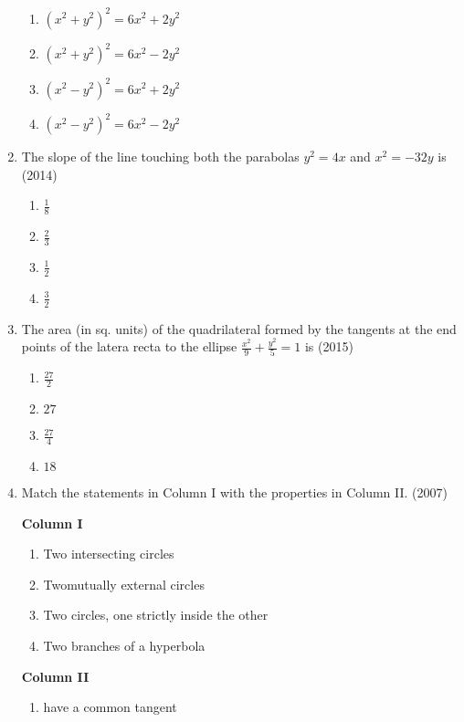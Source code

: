 \begin{enumerate}[label=\thesubsection.\arabic*.,ref=\thesubsection.\theenumi]
\begin{multicols}{2}
\begin{enumerate}
    \item $(x^2+y^2)^2=6x^2+2y^2$
    \item $(x^2+y^2)^2=6x^2-2y^2$
    \item $(x^2-y^2)^2=6x^2+2y^2$
    \item $(x^2-y^2)^2=6x^2-2y^2$
\end{enumerate}
\end{multicols}
\item The slope of the line touching both the parabolas $y^2=4x$ and $x^2=-32y$ is
\hfill(2014)
\begin{multicols}{4}
\begin{enumerate}
    \item $\frac{1}{8}$
    \item $\frac{2}{3}$
    \item $\frac{1}{2}$
    \item $\frac{3}{2}$
\end{enumerate}
\end{multicols}
\item The area (in sq. units) of the quadrilateral formed by the tangents at the end points of the latera recta to the ellipse $\frac{x^2}{9}+\frac{y^2}{5}=1$ is \hfill(2015)
\begin{multicols}{4}
\begin{enumerate}
    \item $\frac{27}{2}$
    \item $27$
    \item $\frac{27}{4}$
    \item $18$
\end{enumerate}
\end{multicols}
\item Match the statements in Column I with the properties in Column II.
	\hfill{(2007)}
\begin{multicols}{2}
\textbf{Column I}
\begin{enumerate}
    \item  Two intersecting circles
    \item Twomutually external circles
    \item Two circles, one strictly inside the other 
    \item  Two branches of a hyperbola  
\end{enumerate}
\textbf{Column II}
\begin{enumerate}
    \item have a common tangent 

\end{enumerate}
\end{multicols}
\end{enumerate}
